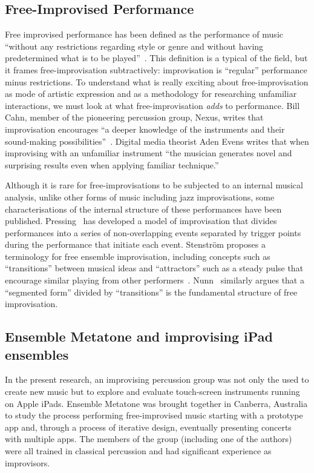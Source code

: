 \documentclass[graybox]{svmult}
\begin{document}
\subsection{Free-Improvised Performance}

Free improvised performance has been defined as the performance of
music ``without any restrictions regarding style or genre and without
having predetermined what is to be played''~\cite{Stenstrom:2009xy}.
This definition is a typical of the field, but it frames
free-improvisation subtractively: improvisation is ``regular''
performance minus restrictions. To understand what is really exciting
about free-improvisation as mode of artistic expression and as a
methodology for researching unfamiliar interactions, we must look at
what free-improvisation \emph{adds} to performance. Bill Cahn, member
of the pioneering percussion group, Nexus, writes that improvisation
encourages ``a deeper knowledge of the instruments and their
sound-making possibilities''~\cite{Cahn:2005uq}. Digital media
theorist Aden Evens writes that when improvising with an unfamiliar
instrument ``the musician generates novel and surprising results even
when applying familiar technique.''~\cite{Evens:2005kx}

Although it is rare for free-improvisations to be subjected to an
internal musical analysis, unlike other forms of music including jazz
improvisations, some characterisations of the internal structure of
these performances have been published.
Pressing~\cite{Pressing:1988uo} has developed a model of improvisation
that divides performances into a series of non-overlapping events
separated by trigger points during the performance that initiate each
event. Stenstr\"om proposes a terminology for free ensemble
improvisation, including concepts such as ``transitions'' between
musical ideas and ``attractors'' such as a steady pulse that encourage
similar playing from other performers~\cite{Stenstrom:2009xy}.
Nunn~\cite{Nunn:1998ly} similarly argues that a ``segmented form''
divided by ``transitions'' is the fundamental structure of free
improvisation.

\subsection{Ensemble Metatone and improvising iPad ensembles}

In the present research, an improvising percussion group was not only
the used to create new music but to explore and evaluate touch-screen
instruments running on Apple iPads. Ensemble Metatone was brought
together in Canberra, Australia to study the process performing
free-improvised music starting with a prototype app and, through a
process of iterative design, eventually presenting concerts with
multiple apps. The members of the group (including one of the authors)
were all trained in classical percussion and had significant
experience as improvisors.
\end{document}
